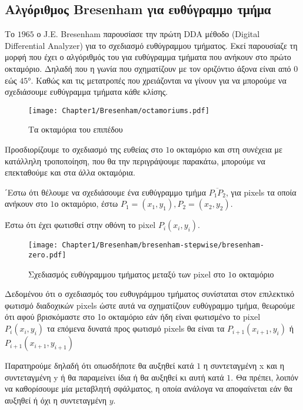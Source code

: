 


\subsection{Αλγόριθμος Bresenham για ευθύγραμμο τμήμα}

Το $1965$ ο J.E. Bresenham παρουσίασε την πρώτη DDA μέθοδο (Digital Differential Analyzer) για το σχεδιασμό ευθύγραμμου τμήματος. Εκεί παρουσίαζε τη μορφή που έχει ο αλγόριθμός του για ευθύγραμμα τμήματα που ανήκουν στο πρώτο οκταμόριο. Δηλαδή που η γωνία που σχηματίζουν με τον οριζόντιο άξονα είναι από $0$ εώς $\ang{45}$. Καθώς και τις μετατροπές που χρειάζονται να γίνουν για να μπορούμε να σχεδιάσουμε ευθύγραμμα τμήματα κάθε κλίσης.


\begin{figure}[h!]
  \begin{center}
	\texttt{[image: Chapter1/Bresenham/octamoriums.pdf]}
  \end{center}
  \caption{Τα οκταμόρια του επιπέδου}
\end{figure}


Προσδιορίζουμε το σχεδιασμό της ευθείας στο $1$ο οκταμόριο και στη συνέχεια με κατάλληλη τροποποίηση, που θα την περιγράψουμε παρακάτω, μπορούμε να επεκταθούμε και στα άλλα οκταμόρια.

΄Εστω ότι θέλουμε να σχεδιάσουμε ένα ευθύγραμμο τμήμα $\overline{P_1 P_2}$, για pixels τα οποία ανήκουν στο $1$ο οκταμόριο, έστω $P_1= (x_1, y_1), P_2= (x_2, y_2)$. 

Έστω ότι έχει φωτισθεί στην οθόνη το pixel $P_i (x_i , y_i)$.

\begin{figure}[h!]
  \begin{center}
	\texttt{[image: Chapter1/Bresenham/bresenham-stepwise/bresenham-zero.pdf]}
  \end{center}
  \caption{Σχεδιασμός ευθύγραμμου τμήματος μεταξύ των pixel στο $1$ο οκταμόριο}
\end{figure}





Δεδομένου ότι ο σχεδιασμός του ευθυγράμμου τμήματος συνίσταται στον επιλεκτικό φωτισμό διαδοχικών pixels ώστε αυτά να σχηματίζουν ευθύγραμμο τμήμα, θεωρούμε ότι αφού βρισκόμαστε στο 1ο οκταμόριο εάν ήδη είναι φωτισμένο το pixel $P_i(x_i , y_i)$ τα επόμενα δυνατά προς φωτισμό pixels θα είναι τα $P_{i+1}(x_{i+1} , y_i)$ ή $P_{i+1}(x_{i+1} , y_{i+1})$

Παρατηρούμε δηλαδή ότι οπωσδήποτε θα αυξηθεί κατά $1$ η συντεταγμένη x και η συντεταγμένη y ή θα παραμείνει ίδια ή θα αυξηθεί κι αυτή κατά $1$. Θα πρέπει, λοιπόν να καθορίσουμε μία μεταβλητή σφάλματος, η οποία ανάλογα να αποφαίνεται εάν θα αυξηθεί ή όχι η συντεταγμένη $y$.

